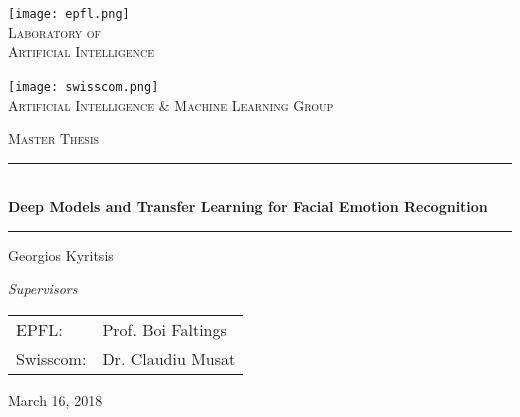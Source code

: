 \documentclass[12pt,twoside]{book}
\begin{document}
\begin{titlepage}
\begin{center}

\begin{minipage}{.4\textwidth}
    \centering
    \texttt{[image: epfl.png]}~\\[0.7cm]
    \textsc{Laboratory of \\ Artificial Intelligence}\\[1.5cm]
\end{minipage}
\hspace{2cm}
\begin{minipage}{0.4\textwidth}
    \centering
    \texttt{[image: swisscom.png]}~\\[0.21cm]
    \textsc{Artificial Intelligence \& Machine Learning Group}\\[1.5cm]
\end{minipage}

\vspace{2cm}

\textsc{\Large Master Thesis}\\[1.5cm]

\noindent\rule{15cm}{0.4pt} \\ [0.4cm]
{ \huge \bfseries Deep Models and Transfer Learning for Facial Emotion Recognition \\[0.4cm] }
\noindent\rule{15cm}{0.4pt}

\vspace{1.5cm}

\begin{center}
    {\Large Georgios Kyritsis}
\end{center}

\vspace{2cm}

\noindent
\begin{flushleft}

\begin{minipage}[t]{0.5\textwidth}
\begin{flushleft} \large
\emph{Supervisors} \\
\vspace{0.5cm}
\begin{tabular}{ll}
EPFL:     & Prof. Boi Faltings \\
Swisscom: & Dr. Claudiu Musat 
\end{tabular}
\end{flushleft}
\end{minipage}%
\end{flushleft}

\vfill

{\large March 16, 2018}

\end{center}
\end{titlepage}
\end{document}

